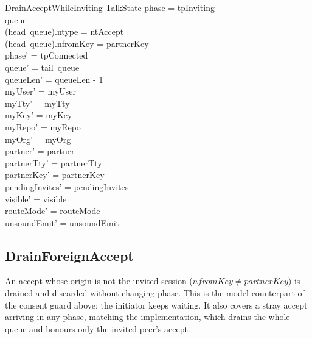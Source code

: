 \documentclass[a4paper,10pt,fleqn]{article}
\begin{document}
\begin{schema}{DrainAcceptWhileInviting}
  \Delta TalkState
\where
  phase = tpInviting \\
  queue \neq \langle \rangle \\
  (head~queue).ntype = ntAccept \\
  (head~queue).nfromKey = partnerKey \\
  phase' = tpConnected \\
  queue' = tail~queue \\
  queueLen' = queueLen - 1 \\
  myUser' = myUser \\
  myTty' = myTty \\
  myKey' = myKey \\
  myRepo' = myRepo \\
  myOrg' = myOrg \\
  partner' = partner \\
  partnerTty' = partnerTty \\
  partnerKey' = partnerKey \\
  pendingInvites' = pendingInvites \\
  visible' = visible \\
  routeMode' = routeMode \\
  unsoundEmit' = unsoundEmit
\end{schema}

\subsection{DrainForeignAccept}

An accept whose origin is not the invited session ($nfromKey \neq
partnerKey$) is drained and discarded without changing phase.  This is
the model counterpart of the consent guard above: the initiator keeps
waiting.  It also covers a stray accept arriving in any phase, matching
the implementation, which drains the whole queue and honours only the
invited peer's accept.
\end{document}
